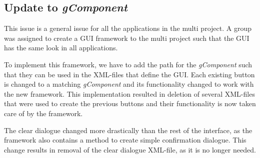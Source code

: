 \subsection{Update to \textit{gComponent}}
This issue is a general issue for all the applications in the multi project. 
A group was assigned to create a GUI framework to the multi project such that the GUI has the same look in all applications.

To implement this framework, we have to add the path for the \textit{gComponent} such that they can be used in the XML-files that define the GUI.
Each existing button is changed to a matching \textit{gComponent} and its functionality changed to work with the new framework.
This implementation resulted in deletion of several XML-files that were used to create the previous buttons and their functionality is now taken care of by the framework.

The clear dialogue changed more drastically than the rest of the interface, as the framework also contains a method to create simple confirmation dialogue. 
This change results in removal of the clear dialogue XML-file, as it is no longer needed.